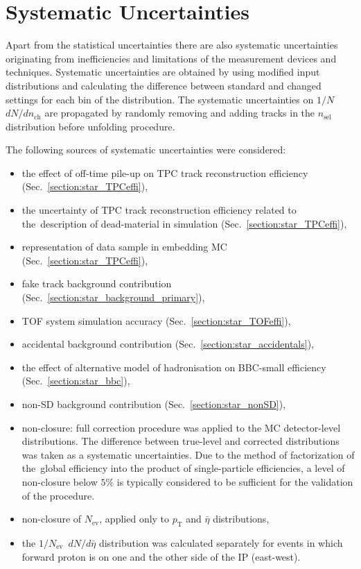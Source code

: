 \chapter{Systematic Uncertainties}\label{section:star_systematics}
Apart from the statistical uncertainties there are also systematic uncertainties originating from inefficiencies and limitations of the measurement devices and techniques. 
Systematic uncertainties are obtained by using modified input distributions and calculating the difference between standard and changed settings for each bin of the distribution. The systematic uncertainties on $1/N$~$dN/dn_\textrm{ch}$ are propagated by randomly removing and adding tracks in the $n_\textrm{sel}$ distribution before  unfolding procedure.

The following sources of systematic uncertainties were considered:
\begin{itemize}
	\item the effect of off-time pile-up on TPC track reconstruction efficiency (Sec.~\ref{section:star_TPCeffi}),
	\item the uncertainty of TPC track reconstruction efficiency related to the~description of dead-material in simulation (Sec.~\ref{section:star_TPCeffi}),
	\item representation of data sample in embedding MC (Sec.~\ref{section:star_TPCeffi}),
	\item fake track background contribution (Sec.~\ref{section:star_background_primary}),
	\item TOF system simulation accuracy (Sec.~\ref{section:star_TOFeffi}),
	\item accidental background contribution (Sec.~\ref{section:star_accidentals}),
	\item the effect of alternative model of hadronisation on BBC-small efficiency (Sec.~\ref{section:star_bbc}),
	\item non-SD background contribution (Sec.~\ref{section:star_nonSD}),
	\item non-closure: full correction procedure was applied to the MC detector-level distributions. The difference between true-level and corrected distributions was taken as a systematic uncertainties. Due to the method of factorization of the~global efficiency into the product of single-particle efficiencies, a level of non-closure below $5\%$ is typically considered to be sufficient for the validation of the procedure.
	\item non-closure of $N_\textrm{ev}$, applied only to $p_\textrm{T}$ and $\bar{\eta}$ distributions,
	\item the $1/N_\textrm{ev}$~$dN/d\bar{\eta}$ distribution was calculated separately for events in which forward proton is on one and the other side of the IP (east-west).
\end{itemize}



